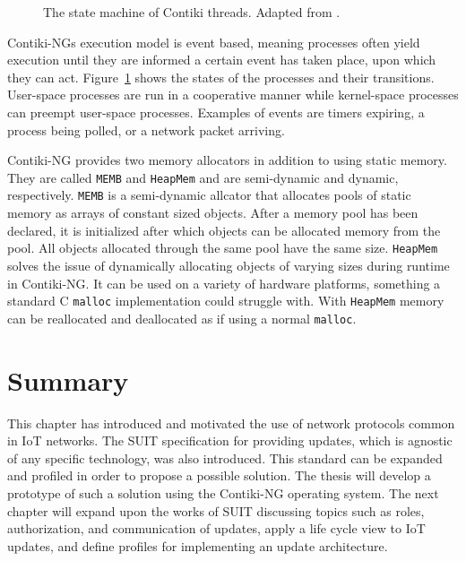 \documentclass[0-thesis.tex]{subfiles}
\begin{document}
\begin{figure}
    \caption{The state machine of Contiki threads. Adapted from \parencite{contiki-multithreading}.}
    \label{fig:state-machine}
\end{figure}

Contiki-NGs execution model is event based, meaning processes often yield execution until
they are informed a certain event has taken place, upon which they can act.
Figure~\ref{fig:state-machine} shows the states of the processes and their transitions.
User-space processes are run in a cooperative manner while kernel-space processes can
preempt user-space processes. Examples of events are timers expiring, a process being
polled, or a network packet arriving.

Contiki-NG provides two memory allocators in addition to using static memory. They are
called \texttt{MEMB} and \texttt{HeapMem} and are semi-dynamic and dynamic, respectively.
\texttt{MEMB} is a semi-dynamic allcator that allocates pools of static memory as arrays
of constant sized objects. After a memory pool has been declared, it is initialized after
which objects can be allocated memory from the pool. All objects allocated through the
same pool have the same size. \texttt{HeapMem} solves the issue of dynamically allocating
objects of varying sizes during runtime in Contiki-NG. It can be used on a variety of
hardware platforms, something a standard C \texttt{malloc} implementation could struggle
with. With \texttt{HeapMem} memory can be reallocated and deallocated as if using a normal
\texttt{malloc}.

\section{Summary}
\label{sec:2-summary}
This chapter has introduced and motivated the use of network protocols common in IoT
networks. The SUIT specification for providing updates, which is agnostic of any specific
technology, was also introduced. This standard can be expanded and profiled in order to
propose a possible solution. The thesis will develop a prototype of such a solution using
the Contiki-NG operating system. The next chapter will expand upon the works of SUIT
discussing topics such as roles, authorization, and communication of updates, apply a life
cycle view to IoT updates, and define profiles for implementing an update architecture.
\end{document}

